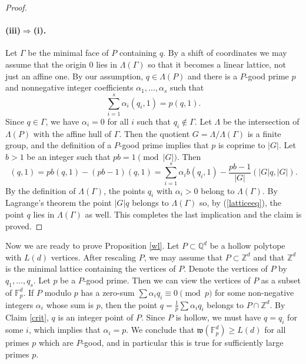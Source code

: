 \documentclass{daj}
\renewcommand{\ge}{\geqslant}
\newcommand{\w}{\mathfrak w}
\newcommand{\Q}{\mathbb Q}
\newcommand{\Z}{\mathbb Z}
\newcommand{\FF}{\mathbb F}
\theoremstyle{definition}
\theoremstyle{remark}
\theoremstyle{definition}
\theoremstyle{definition}
\begin{document}
\begin{proof}
\paragraph{(iii)$\Rightarrow$(i).} Let $\Gamma$ be the minimal face of $P$ containing $q$. By a shift of coordinates we may assume that the origin $0$ lies in $\Lambda(\Gamma)$ so that it becomes a linear lattice, not just an affine one. 
By our assumption, $q \in \Lambda(P)$ and there is a $P$-good prime $p$ and nonnegative integer coefficients $\alpha_1, \ldots, \alpha_s$ such that
$$
\sum_{i=1}^s \alpha_i (q_i, 1) = p(q, 1).
$$
Since $q \in \Gamma$, we have $\alpha_i = 0$ for all $i$ such that $q_i \not \in \Gamma$. Let $\Lambda$ be the intersection of $\Lambda(P)$ with the affine hull of $\Gamma$. Then the quotient $G= \Lambda/\Lambda(\Gamma)$ is a finite group, and the definition of a $P$-good prime implies that $p$ is coprime to $|G|$. Let $b > 1$ be an integer such that $p b = 1 \pmod{|G|}$. Then
\begin{equation}\label{latticeeq}
(q, 1) = pb (q, 1) - (pb-1) (q, 1) = \sum_{i=1}^s \alpha_i b (q_i, 1) - \frac{pb-1}{|G|} (|G| q, |G|).
\end{equation}
By the definition of $\Lambda(\Gamma)$, the points $q_i$ with $\alpha_i >0$ belong to $\Lambda(\Gamma)$. By Lagrange's theorem the point $|G|q$ belongs to $\Lambda(\Gamma)$ so, by (\ref{latticeeq}), the point $q$ lies in $\Lambda(\Gamma)$ as well. This completes the last implication and the claim is proved. 
\end{proof}

Now we are ready to prove Proposition \ref{wl}. Let $P \subset \Q^d$ be a hollow polytope with $L(d)$ vertices. After rescaling $P$, we may assume that $P \subset \Z^d$ and that $\Z^d$ is the minimal lattice containing the vertices of $P$. Denote the vertices of $P$ by $q_1, \ldots, q_s$. Let $p$ be a $P$-good prime. Then we can view the vertices of $P$ as a subset of $\FF_p^d$. If $P$ modulo $p$ has a zero-sum $\sum \alpha_i q_i \equiv 0 \pmod p$ for some non-negative integers $\alpha_i$ whose sum is $p$, then the point $q = \frac{1}{p} \sum \alpha_i q_i$ belongs to $P \cap \Z^d$. By Claim \ref{crit}, $q$ is an integer point of $P$. Since $P$ is hollow, we must have $q = q_i$ for some $i$, which implies that $\alpha_i = p$. 
We conclude that $\w(\FF_p^d) \ge L(d)$ for all primes $p$ which are $P$-good, and in particular this is true for sufficiently large primes $p$.
\end{document}
